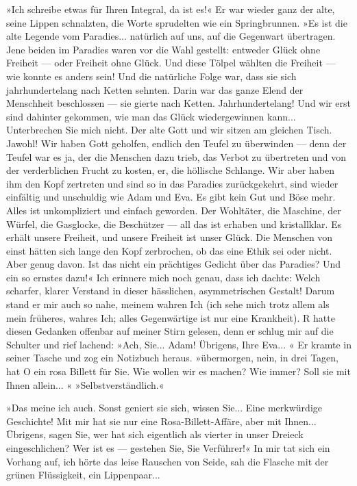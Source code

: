 »Ich schreibe etwas für Ihren Integral, da ist es!« Er war wieder
ganz der alte, seine Lippen schnalzten, die Worte sprudelten wie
ein Springbrunnen. »Es ist die alte Legende vom Paradies...
natürlich auf uns, auf die Gegenwart übertragen. Jene beiden im
Paradies waren vor die Wahl gestellt: entweder Glück ohne Freiheit
— oder Freiheit ohne Glück. Und diese Tölpel wählten die Freiheit —
wie konnte es anders sein! Und die natürliche Folge war, dass sie
sich jahrhundertelang nach Ketten sehnten. Darin war das ganze
Elend der Menschheit beschlossen — sie gierte nach Ketten.
Jahrhundertelang! Und wir erst sind dahinter gekommen, wie man das
Glück wiedergewinnen kann... Unterbrechen Sie mich nicht. Der alte
Gott und wir sitzen am gleichen Tisch. Jawohl! Wir haben Gott
geholfen, endlich den Teufel zu überwinden — denn der Teufel war es
ja, der die Menschen dazu trieb, das Verbot zu übertreten und von
der verderblichen Frucht zu kosten, er, die höllische Schlange. Wir
aber haben ihm den Kopf zertreten und sind so in das Paradies
zurückgekehrt, sind wieder einfältig und unschuldig wie Adam und
Eva. Es gibt kein Gut und Böse mehr. Alles ist unkompliziert und
einfach geworden. Der Wohltäter, die Maschine, der Würfel, die
Gasglocke, die Beschützer — all das ist erhaben und kristallklar.
Es erhält unsere Freiheit, und unsere Freiheit ist unser Glück. Die
Menschen von einst hätten sich lange den Kopf zerbrochen, ob das
eine Ethik sei oder nicht. Aber genug davon. Ist das nicht ein
prächtiges Gedicht über das Paradies? Und ein so ernstes dazu!« Ich
erinnere mich noch genau, dass ich dachte: Welch scharfer, klarer
Verstand in dieser hässlichen, asymmetrischen Gestalt! Darum stand
er mir auch so nahe, meinem wahren Ich (ich sehe mich trotz allem
als mein früheres, wahres Ich; alles Gegenwärtige ist nur eine
Krankheit). R hatte diesen Gedanken offenbar auf meiner Stirn
gelesen, denn er schlug mir auf die Schulter und rief lachend:
»Ach, Sie... Adam! Übrigens, Ihre Eva... « Er kramte in seiner
Tasche und zog ein Notizbuch heraus. »übermorgen, nein, in drei
Tagen, hat O ein rosa Billett für Sie. Wie wollen wir es machen?
Wie immer? Soll sie mit Ihnen allein... « »Selbstverständlich.«

»Das meine ich auch. Sonst geniert sie sich, wissen Sie... Eine
merkwürdige Geschichte! Mit mir hat sie nur eine
Rosa-Billett-Affäre, aber mit Ihnen... Übrigens, sagen Sie, wer hat
sich eigentlich als vierter in unser Dreieck eingeschlichen? Wer
ist es — gestehen Sie, Sie Verführer!« In mir tat sich ein Vorhang
auf, ich hörte das leise Rauschen von Seide, sah die Flasche mit
der grünen Flüssigkeit, ein Lippenpaar...


